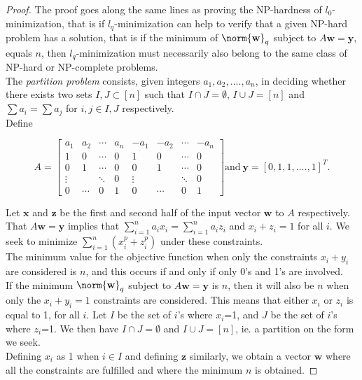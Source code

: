 \begin{proof}
The proof goes along the same lines as proving the NP-hardness of $l_0$-minimization, that is if $l_q$-minimization can help to verify that a given NP-hard problem has a solution, that is if the minimum of $\norm{ \mathbf{w}}_{q}$ subject to $A\mathbf{w}=\mathbf{y}$, equals $n$, then $l_q$-minimization must necessarily also belong to the same class of NP-hard or NP-complete problems. \\
The \emph{partition problem} consists, given integers $a_1,a_2,....,a_n$, in deciding whether there exists two sets $I, J \subset [n]$ such that  $I \cap J = \emptyset$, $I \cup J = [n]$ and $\sum{a_i} = \sum{a_j}$ for $i, j \in I, J$ respectively.\\
Define

\begin{equation*}
A =
\begin{bmatrix}
   a_1 & a_2 & \cdots & a_n & -a_1 & -a_2 & \cdots & -a_n \\
   1 & 0 & \cdots & 0 & 1 & 0 & \cdots & 0 \\
   0 & 1 & \cdots & 0 & 0 & 1 & \cdots & 0 \\
   \vdots  & \ & \ddots & 0 & \vdots & \ & \ddots & 0 \\
  0 &\cdots & 0 & 1& 0& \cdots & 0 &1 
 \end{bmatrix}
 \text{and} \ \mathbf{y} = [0,1,1,....,1]^{T}.
\end{equation*}

Let $\mathbf{x}$ and $\mathbf{z}$ be the first and second half of the input vector $\mathbf{w}$ to $A$ respectively. That $A\mathbf{w}=\mathbf{y}$ implies that $\sum_{i=1}^{n}a_{i}x_{i} = \sum_{i=1}^{n}a_{i}z_{i}$ and $x_i+z_i = 1$ for all $i$. We seek to minimize $\sum_{i=1}^{n}(x_i^p + z_i^p)$ under these constraints. \\
The minimum value for the objective function when only the constraints $x_i+y_i$ are considered is $n$, and this occurs if and only if only 0's and 1's are involved. \\
If the minimum $\norm{ \mathbf{w}}_{q}$ subject to $A\mathbf{w}=\mathbf{y}$ is $n$, then it will also be $n$ when only the $x_i+y_i = 1 $ constraints are considered. This means that either $x_i$ or $z_i$ is equal to 1, for all $i$. Let $I$ be the set of $i$'s where $x_i$=1, and $J$ be the set of $i$'s where $z_i$=1. We then have $I \cap J = \emptyset$ and $I \cup J = [n]$, ie. a partition on the form we seek. \\Defining $x_i$ as 1 when $i \in I$ and defining $\mathbf{z}$ similarly, we obtain a vector $\mathbf{w}$ where all the constraints are fulfilled and where the minimum $n$ is obtained.


 
\end{proof}



